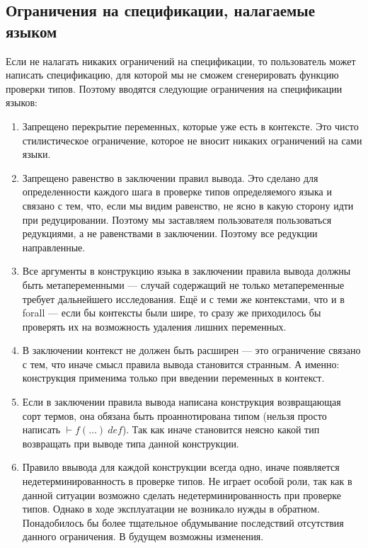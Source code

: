 \subsection{Ограничения на спецификации, налагаемые языком}\label{constraints}
Если не налагать никаких ограничений на спецификации, то пользователь может написать спецификацию, для которой мы не сможем сгенерировать функцию проверки типов. Поэтому вводятся следующие ограничения на спецификации языков:

\begin{enumerate}
\item Запрещено перекрытие переменных, которые уже есть в контексте. Это чисто стилистическое ограничение, которое не вносит никаких ограничений на сами языки.

\item \label{directed_reducts} Запрещено равенство в заключении правил вывода. Это сделано для определенности каждого шага в проверке типов определяемого языка и связано с тем, что, если мы видим равенство, не ясно в какую сторону идти при редуцировании. Поэтому мы заставляем пользователя пользоваться редукциями, а не равенствами в заключении. Поэтому все редукции направленные.

\item Все аргументы в конструкцию языка в заключении правила вывода должны быть метапеременными --- случай содержащий не только метапеременные требует дальнейшего исследования. Ещё и с теми же контекстами, что и в forall --- если бы контексты были шире, то сразу же приходилось бы проверять их на возможность удаления лишних переменных.

\item В заключении контекст не должен быть расширен --- это ограничение связано с тем, что иначе смысл правила вывода становится странным. А именно: конструкция применима только при введении переменных в контекст.

\item Если в заключении правила вывода написана конструкция возвращающая сорт термов, она обязана быть проаннотирована типом (нельзя просто написать $ \vdash f(\ldots)\ def$). Так как иначе становится неясно какой тип возвращать при выводе типа данной конструкции.

\item \label{one_per_fun} Правило ввывода для каждой конструкции всегда одно, иначе появляется недетерминированность в проверке типов. Не играет особой роли, так как в данной ситуации возможно сделать недетерминированность при проверке типов. Однако в ходе эксплуатации не возникало нужды в обратном. Понадобилось бы более тщательное обдумывание последствий отсутствия данного ограничения. В будущем возможны изменения.


\end{enumerate}
